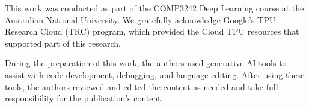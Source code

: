 \documentclass[sigconf]{ceurart}
\begin{document}


\maketitle












\begin{acknowledgments}
  This work was conducted as part of the COMP3242 Deep Learning course at the Australian National University. We gratefully acknowledge Google's TPU Research Cloud (TRC) program, which provided the Cloud TPU resources that supported part of this research.
\end{acknowledgments}

\begin{aideclaration}
  During the preparation of this work, the authors used generative AI tools to assist with code development, debugging, and language editing. After using these tools, the authors reviewed and edited the content as needed and take full responsibility for the publication's content.
\end{aideclaration}


\end{document}
